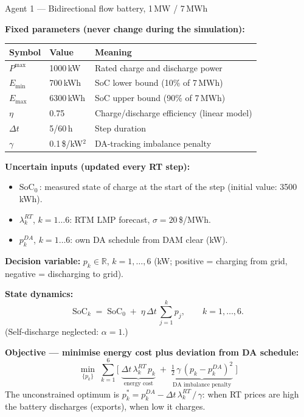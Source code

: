 \documentclass[11pt, letterpaper]{article}
\newcommand{\Dt}{\Delta t}
\begin{document}
\begin{agentbox}{Agent 1 — Bidirectional flow battery, 1\,MW / 7\,MWh}

\textbf{Fixed parameters (never change during the simulation):}
\begin{center}
\small
\begin{tabular}{lll}
\toprule
Symbol & Value & Meaning \\
\midrule
$P^{\max}$ & 1000\,kW & Rated charge and discharge power \\
$E_{\min}$ & 700\,kWh & SoC lower bound (10\% of 7\,MWh) \\
$E_{\max}$ & 6300\,kWh & SoC upper bound (90\% of 7\,MWh) \\
$\eta$     & 0.75      & Charge/discharge efficiency (linear model) \\
$\Dt$      & 5/60\,h   & Step duration \\
$\gamma$   & 0.1\,\$/kW$^2$ & DA-tracking imbalance penalty \\
\bottomrule
\end{tabular}
\end{center}

\textbf{Uncertain inputs (updated every RT step):}
\begin{itemize}[nosep]
  \item $\text{SoC}_0$\,: measured state of charge at the start of the step (initial value: 3500\,kWh).
  \item $\lambda^{RT}_k$, $k=1\ldots6$: RTM LMP forecast, $\sigma = 20$\,\$/MWh.
  \item $p^{DA}_k$, $k=1\ldots6$: own DA schedule from DAM clear (kW).
\end{itemize}

\textbf{Decision variable:} $p_k \in \mathbb{R}$, $k=1,\ldots,6$ (kW; positive = charging from grid, negative = discharging to grid).

\textbf{State dynamics:}
\[
\text{SoC}_k \;=\; \text{SoC}_0 \;+\; \eta\,\Dt\,\sum_{j=1}^{k} p_j, \qquad k = 1,\ldots,6.
\]
(Self-discharge neglected: $\alpha = 1$.)

\textbf{Objective — minimise energy cost plus deviation from DA schedule:}
\[
\min_{\{p_k\}}\;\sum_{k=1}^{6}\Big[\;\underbrace{\Dt\,\lambda^{RT}_k\,p_k}_{\text{energy cost}}
  \;+\; \underbrace{\tfrac{1}{2}\,\gamma\,(p_k - p^{DA}_k)^2}_{\text{DA imbalance penalty}}\;\Big]
\]
The unconstrained optimum is $p^*_k = p^{DA}_k - \Dt\,\lambda^{RT}_k\,/\,\gamma$: when RT prices are high the battery discharges (exports), when low it charges.


\end{agentbox}
\end{document}
